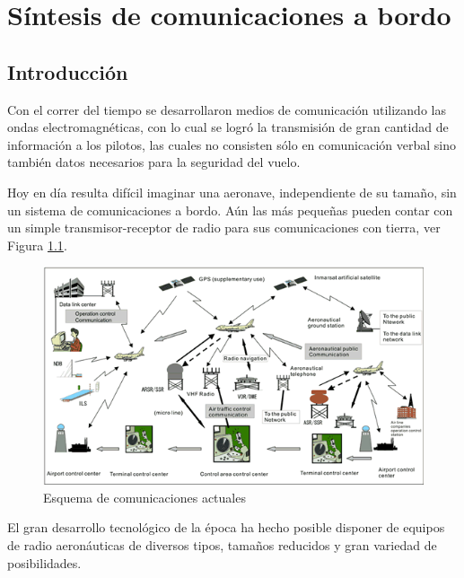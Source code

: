 

\chapter{S\'intesis de comunicaciones a bordo}
\label{chap:09.sintesis.comunicaciones.a.bordo}


\section{Introducci\'on}
\label{sec:09.00.introduccion}


Con el correr del tiempo se desarrollaron medios de comunicaci\'on utilizando las ondas electromagn\'eticas, con lo cual se logr\'o la transmisi\'on de gran cantidad de informaci\'on a los pilotos, las cuales no consisten s\'olo en comunicaci\'on verbal sino tambi\'en datos necesarios para la seguridad del vuelo.

Hoy en d\'ia resulta dif\'icil imaginar una aeronave, independiente de su tama\~no, sin un sistema de comunicaciones a bordo. A\'un las m\'as peque\~nas pueden contar con un simple transmisor-receptor de radio para sus comunicaciones con tierra, ver Figura \ref{fig:U09.esquema.comunicaciones.actual}.

\begin{figure}[!ht]
  \centering
   \includegraphics[width=\textwidth]{09.sintesis.comunicaciones.a.bordo/Imagenes.U09/comunicaciones.gif}
  \caption{Esquema de comunicaciones actuales}
  \label{fig:U09.esquema.comunicaciones.actual}
\end{figure}

El gran desarrollo tecnol\'ogico de la \'epoca ha hecho posible disponer de equipos de radio aeron\'auticas de diversos tipos, tama\~nos reducidos y gran variedad de posibilidades. 

